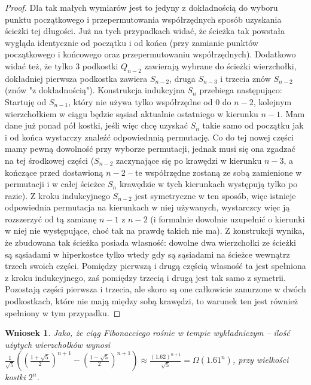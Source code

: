 \documentclass{pracamgr}
\newtheorem{corollary}[theorem]{Wniosek}
\begin{document}
\begin{proof}
     Dla tak małych wymiarów jest to jedyny z dokładnością do wyboru punktu początkowego i przepermutowania współrzędnych sposób uzyskania ścieżki tej długości.
     Już na tych przypadkach widać, że ścieżka tak powstała wygląda identycznie od początku i od końca
     (przy zamianie punktów początkowego i końcowego oraz przepermutowaniu współrzędnych). Dodatkowo widać też,
     że tylko 3 podkostki $Q_{n-2}$ zawierają wybrane do ścieżki wierzchołki, dokładniej pierwsza podkostka zawiera $S_{n-2}$, druga $S_{n-3}$
     i trzecia znów $S_{n-2}$ (znów "z dokładnością").\newline
     Konstrukcja indukcyjna $S_n$ przebiega następująco:\newline
     Startuję od $S_{n-1}$, który nie używa tylko współrzędne od $0$ do $n-2$, kolejnym wierzchołkiem w ciągu będzie sąsiad aktualnie ostatniego w kierunku
     $n-1$. Mam dane już ponad pół kostki, jeśli więc chcę uzyskać $S_n$ takie samo od początku jak i od końca wystarczy znaleźć odpowiednnią permutację.
     Co do tej nowej części mamy pewną dowolność przy wyborze permutacji, jednak musi się ona zgadzać na tej środkowej części
     ($S_{n-2}$ zaczynające się po krawędzi w kierunku $n-3$, a kończące przed dostawioną $n-2$ -- te współrzędne zostaną ze sobą zamienione w permutacji
     i w całej ścieżce $S_n$ krawędzie w tych kierunkach występują tylko po razie). Z kroku indukcyjnego $S_{n-2}$ jest symetryczne w ten sposób,
     więc istnieje odpowiednia permutacja na kierunkach w niej używanych, wystarczcy więc ją rozszerzyć od tą zamianę $n-1$ z $n-2$
     (i formalnie dowolnie uzupełnić o kierunki w niej nie występujące, choć tak na prawdę takich nie ma).
     Z konstrukcji wynika, że zbudowana tak ścieżka posiada własność: dowolne dwa wierzchołki ze ścieżki są sąsiadami w hiperkostce
     tylko wtedy gdy są sąsiadami na ścieżce wewnątrz trzech swoich części. Pomiędzy pierwszą i drugą częścią własność ta jest spełniona z kroku indukcyjnego,
     zaś pomiędzy trzecią i drugą jest tak samo z symetrii. Pozostają części pierwsza i trzecia, ale skoro są one całkowicie zanurzone w dwóch podkostkach,
     które nie mają między sobą krawędzi, to warunek ten jest również spełniony w tym przypadku.
    \end{proof}
    \begin{corollary}\label{fibo -> wykladniczy}
     Jako, że ciąg Fibonacciego rośnie w tempie wykładniczym -- ilość użytych wierzchołków wynosi
     $\frac{1}{\sqrt{5}}((\frac{1+\sqrt{5}}{2})^{n+1}-(\frac{1-\sqrt{5}}{2})^{n+1})\approx \frac{(1.62)^{n+1}}{\sqrt{5}}=\Omega(1.61^n)$, przy wielkości kostki $2^n$.
    \end{corollary}
\end{document}
